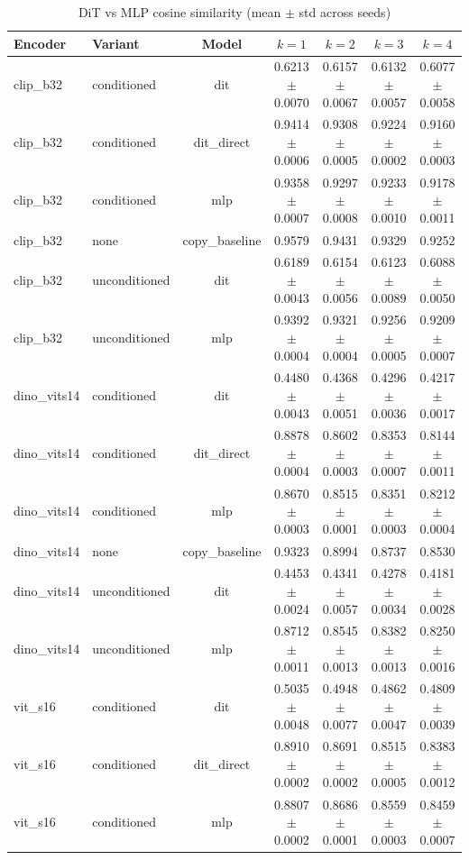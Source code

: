 \begin{table}[ht]
\centering
\caption{DiT vs MLP cosine similarity (mean $\pm$ std across seeds)}
\label{tab:dit-vs-mlp}
\scriptsize
\begin{tabular}{llccccc}
\toprule
Encoder & Variant & Model & $k{=}1$ & $k{=}2$ & $k{=}3$ & $k{=}4$ \\
\midrule
  clip\_b32 & conditioned & dit & 0.6213$\pm$0.0070 & 0.6157$\pm$0.0067 & 0.6132$\pm$0.0057 & 0.6077$\pm$0.0058 \\
  clip\_b32 & conditioned & dit_direct & 0.9414$\pm$0.0006 & 0.9308$\pm$0.0005 & 0.9224$\pm$0.0002 & 0.9160$\pm$0.0003 \\
  clip\_b32 & conditioned & mlp & 0.9358$\pm$0.0007 & 0.9297$\pm$0.0008 & 0.9233$\pm$0.0010 & 0.9178$\pm$0.0011 \\
  clip\_b32 & none & copy_baseline & 0.9579 & 0.9431 & 0.9329 & 0.9252 \\
  clip\_b32 & unconditioned & dit & 0.6189$\pm$0.0043 & 0.6154$\pm$0.0056 & 0.6123$\pm$0.0089 & 0.6088$\pm$0.0050 \\
  clip\_b32 & unconditioned & mlp & 0.9392$\pm$0.0004 & 0.9321$\pm$0.0004 & 0.9256$\pm$0.0005 & 0.9209$\pm$0.0007 \\
\midrule
  dino\_vits14 & conditioned & dit & 0.4480$\pm$0.0043 & 0.4368$\pm$0.0051 & 0.4296$\pm$0.0036 & 0.4217$\pm$0.0017 \\
  dino\_vits14 & conditioned & dit_direct & 0.8878$\pm$0.0004 & 0.8602$\pm$0.0003 & 0.8353$\pm$0.0007 & 0.8144$\pm$0.0011 \\
  dino\_vits14 & conditioned & mlp & 0.8670$\pm$0.0003 & 0.8515$\pm$0.0001 & 0.8351$\pm$0.0003 & 0.8212$\pm$0.0004 \\
  dino\_vits14 & none & copy_baseline & 0.9323 & 0.8994 & 0.8737 & 0.8530 \\
  dino\_vits14 & unconditioned & dit & 0.4453$\pm$0.0024 & 0.4341$\pm$0.0057 & 0.4278$\pm$0.0034 & 0.4181$\pm$0.0028 \\
  dino\_vits14 & unconditioned & mlp & 0.8712$\pm$0.0011 & 0.8545$\pm$0.0013 & 0.8382$\pm$0.0013 & 0.8250$\pm$0.0016 \\
\midrule
  vit\_s16 & conditioned & dit & 0.5035$\pm$0.0048 & 0.4948$\pm$0.0077 & 0.4862$\pm$0.0047 & 0.4809$\pm$0.0039 \\
  vit\_s16 & conditioned & dit_direct & 0.8910$\pm$0.0002 & 0.8691$\pm$0.0002 & 0.8515$\pm$0.0005 & 0.8383$\pm$0.0012 \\
  vit\_s16 & conditioned & mlp & 0.8807$\pm$0.0002 & 0.8686$\pm$0.0001 & 0.8559$\pm$0.0003 & 0.8459$\pm$0.0007 \\

\end{tabular}
\end{table}
